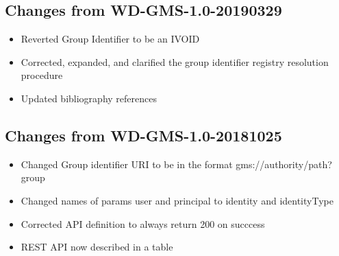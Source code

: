 \documentclass[11pt,a4paper]{ivoa}
\begin{document}
\subsection{Changes from WD-GMS-1.0-20190329}
\begin{itemize}
\item{Reverted Group Identifier to be an IVOID}
\item{Corrected, expanded, and clarified the group identifier registry resolution procedure}
\item{Updated bibliography references}
\end{itemize}

\subsection{Changes from WD-GMS-1.0-20181025}
\begin{itemize}
\item{Changed Group identifier URI to be in the format gms://authority/path?group}
\item{Changed names of params user and principal to identity and identityType}
\item{Corrected API definition to always return 200 on succcess}
\item{REST API now described in a table}
\end{itemize}



\end{document}
